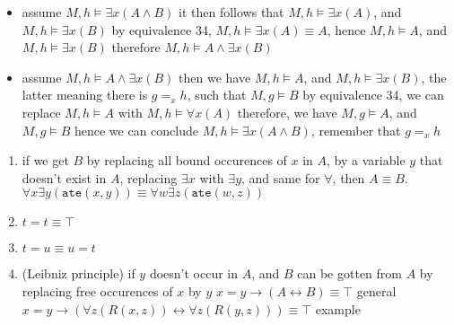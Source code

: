 \documentclass[a4paper, 12pt]{article}
\begin{document}
            \begin{itemize}
                \itemsep0em
                \item assume $M, h \vDash \exists x (A \land B)$
                    \subitem it then follows that $M, h \vDash \exists x (A)$, and $M, h \vDash \exists x (B)$
                    \subitem by equivalence 34, $M, h \vDash \exists x (A) \equiv A$, hence $M, h \vDash A$, and $M, h \vDash \exists x (B)$
                    \subitem therefore $M, h \vDash A \land \exists x (B)$
                \item assume $M, h \vDash A \land \exists x (B)$
                    \subitem then we have $M, h \vDash A$, and $M, h \vDash \exists x (B)$, the latter meaning there is $g =_x h$, such that $M, g \vDash B$
                    \subitem by equivalence 34, we can replace $M, h \vDash A$ with $M, h \vDash \forall x (A)$
                    \subitem therefore, we have $M, g \vDash A$, and $M, g \vDash B$
                    \subitem hence we can conclude $M, h \vDash \exists x (A \land B)$, remember that $g =_x h$
            \end{itemize}
            \begin{enumerate}[1.]
                \itemsep0em
                \setcounter{enumi}{37}
                \item if we get $B$ by replacing all bound occurences of $x$ in $A$, by a variable $y$ that doesn't exist in $A$, replacing $\exists x$ with $\exists y$, and same for $\forall$, then $A \equiv B$. \hfill $\forall x \exists y (\texttt{ate}(x, y)) \equiv \forall w \exists z (\texttt{ate}(w, z))$
                \item $t = t \equiv \top$
                \item $t = u \equiv u = t$
                \item (Leibniz principle) if $y$ doesn't occur in $A$, and $B$ can be gotten from $A$ by replacing free occurences of $x$ by $y$
                    \subitem $x = y \rightarrow (A \leftrightarrow B) \equiv \top$ \hfill general
                    \subitem $x = y \rightarrow (\forall z (R(x, z)) \leftrightarrow \forall z (R(y, z))) \equiv \top$ \hfill example
            \end{enumerate}
\end{document}
